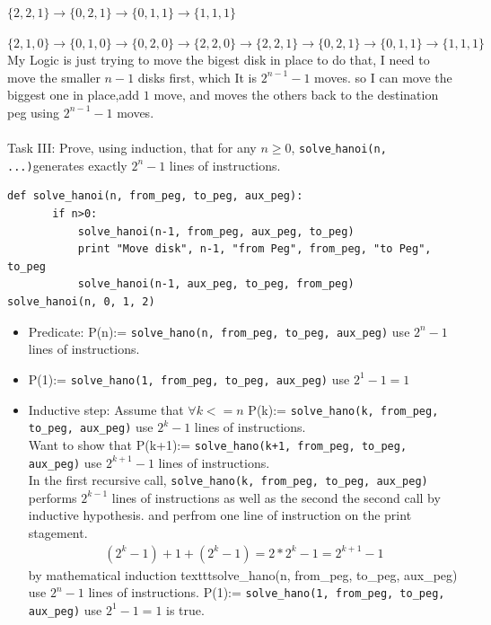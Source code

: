 \documentclass[a4paper, 11pt]{article}
\begin{document}
\item $\{2, 2, 1\}\to\{0, 2, 1\}\to\{0, 1, 1\}\to\{1, 1, 1\}$\\
\item$\{2, 1, 0\}\to\{0, 1, 0\}\to\{0, 2, 0\}\to\{2, 2, 0\}\to\{2, 2, 1\}\to\{0, 2, 1\}\to\{0, 1, 1\}\to\{1, 1, 1\}$\\

My Logic is just trying to move the bigest disk in place to do that, I need to move the smaller $n-1$ disks first, which It is $2^{n-1} -1$ moves. so I can move the biggest one in place,add $1$ move, and moves the others back to the destination peg using $2^{n-1} -1$ moves.
\\
\\
Task III: Prove, using induction, that for any $n \geq 0 $, \texttt{solve$\_$hanoi(n, ...)}generates exactly $2^{n} -1$ lines of instructions.

\begin{verbatim}
def solve_hanoi(n, from_peg, to_peg, aux_peg): 
       if n>0:
           solve_hanoi(n-1, from_peg, aux_peg, to_peg)
           print "Move disk", n-1, "from Peg", from_peg, "to Peg", to_peg
           solve_hanoi(n-1, aux_peg, to_peg, from_peg)
solve_hanoi(n, 0, 1, 2)

\end{verbatim}

\begin{itemize}
	\item Predicate: P(n):= \texttt{solve\_hano(n, from\_peg, to\_peg, aux\_peg)} use $2^{n}-1$ lines of instructions.
	\item P(1):= \texttt{solve\_hano(1, from\_peg, to\_peg, aux\_peg)} use $2^{1}-1 = 1$ 
	\item Inductive step: Assume that  $ \forall k < =n$ P(k):= \texttt{solve\_hano(k, from\_peg, to\_peg, aux\_peg)} use $2^{k}-1$ lines of instructions.
	\\ Want to show that P(k+1):= \texttt{solve\_hano(k+1, from\_peg, to\_peg, aux\_peg)} use $2^{k+1}-1$ lines of instructions.
	\\
	In the first recursive call, \texttt{solve\_hano(k, from\_peg, to\_peg, aux\_peg)} performs $2^{k-1}$ lines of instructions as well as the second the second call by inductive hypothesis. and perfrom one line of instruction on the print stagement.
	\begin{eqnarray*}
	(2^{k} -1) + 1 + (2^{k} -1) = 2*2^{k} -1 = 2^{k+1} -1
	\end{eqnarray*}
	by mathematical induction texttt{solve\_hano(n, from\_peg, to\_peg, aux\_peg)} use $2^{n}-1$ lines of instructions.
	P(1):= \texttt{solve\_hano(1, from\_peg, to\_peg, aux\_peg)} use $2^{1}-1 = 1$ is true.
\end{itemize}
\end{document}
